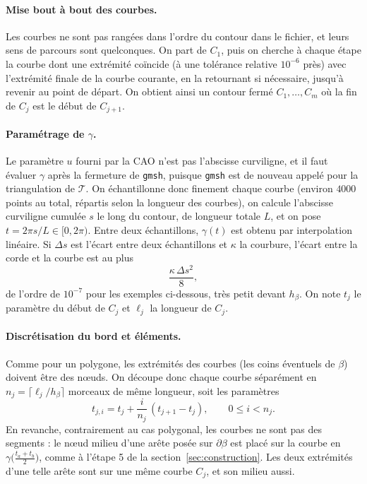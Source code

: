 \documentclass[11pt,a4paper]{article}
\begin{document}
\paragraph{Mise bout à bout des courbes.} Les courbes ne sont pas rangées
dans l'ordre du contour dans le fichier, et leurs sens de parcours sont
quelconques. On part de $C_1$, puis on cherche à chaque étape la courbe dont
une extrémité coïncide (à une tolérance relative $10^{-6}$ près) avec
l'extrémité finale de la courbe courante, en la retournant si nécessaire,
jusqu'à revenir au point de départ. On obtient ainsi un contour fermé
$C_1, \dots, C_m$ où la fin de $C_j$ est le début de $C_{j+1}$.

\paragraph{Paramétrage de $\gamma$.} Le paramètre $u$ fourni par la CAO n'est
pas l'abscisse curviligne, et il faut évaluer $\gamma$ après la fermeture de
\texttt{gmsh}, puisque \texttt{gmsh} est de nouveau appelé pour la
triangulation de $\mathcal{T}$. On échantillonne donc finement chaque courbe
(environ $4000$ points au total, répartis selon la longueur des courbes), on
calcule l'abscisse curviligne cumulée $s$ le long du contour, de longueur
totale $L$, et on pose $t = 2\pi s / L \in [0, 2\pi)$. Entre deux
échantillons, $\gamma(t)$ est obtenu par interpolation linéaire. Si
$\Delta s$ est l'écart entre deux échantillons et $\kappa$ la courbure,
l'écart entre la corde et la courbe est au plus
\[
\frac{\kappa\, \Delta s^2}{8},
\]
de l'ordre de $10^{-7}$ pour les exemples ci-dessous, très petit devant
$h_\beta$. On note $t_j$ le paramètre du début de $C_j$ et $\ell_j$ la
longueur de $C_j$.

\paragraph{Discrétisation du bord et éléments.} Comme pour un polygone, les
extrémités des courbes (les coins éventuels de $\beta$) doivent être des
nœuds. On découpe donc chaque courbe séparément en
$n_j = \lceil \ell_j / h_\beta \rceil$ morceaux de même longueur, soit les
paramètres
\[
t_{j,i} = t_j + \frac{i}{n_j}\,(t_{j+1} - t_j),
\qquad 0 \le i < n_j .
\]
En revanche, contrairement au cas polygonal, les courbes ne sont pas des
segments : le nœud milieu d'une arête posée sur $\partial\beta$ est placé sur
la courbe en $\gamma\big(\tfrac{t_a + t_b}{2}\big)$, comme à l'étape 5 de la
section~\ref{sec:construction}. Les deux extrémités d'une telle arête sont
sur une même courbe $C_j$, et son milieu aussi.
\end{document}
